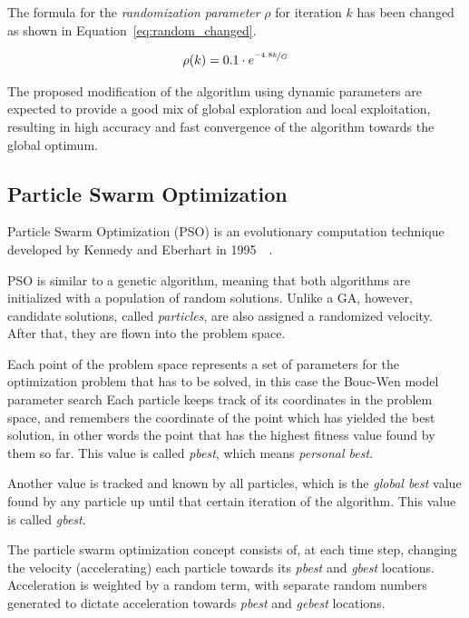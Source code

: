 The formula for the \textit{randomization parameter} $\rho$
for iteration $k$ has been changed as shown in Equation~\ref{eq:random_changed}.

\begin{align}
\label{eq:random_changed}
\rho(k) = 0.1 \cdot e^{\nicefrac{-4.8k}{G}}
\end{align}

The proposed modification of the algorithm using dynamic parameters
are expected to provide a good mix of global exploration and local exploitation,
resulting in high accuracy and fast convergence of the algorithm towards
the global optimum.

\subsection{Particle Swarm Optimization}
\label{sec:5.pso}

Particle Swarm Optimization (PSO) is an evolutionary computation technique
developed by Kennedy and Eberhart in 1995~\cite{kennedy2011particle}~\cite{eberhart1995new}.

PSO is similar to a genetic algorithm, meaning that both algorithms 
are initialized with a population of random solutions. Unlike a GA, however,
candidate solutions, called \textit{particles}, are also assigned a randomized velocity.
After that, they are flown into the problem space.

Each point of the problem space represents a set of parameters for the optimization
problem that has to be solved, in this case the Bouc-Wen model parameter search
Each particle keeps track of its coordinates in the problem space,
and remembers the coordinate of the point which has yielded the best solution,
in other words the point that has the highest fitness value found by them so far.
This value is called \textit{pbest}, which means \textit{personal best}.

Another value is tracked and known by all particles, which is the \textit{global best}
value found by any particle up until that certain iteration of the algorithm.
This value is called \textit{gbest}.

The particle swarm optimization concept consists of, at each time step,
changing the velocity (accelerating) each particle towards its \textit{pbest}
and \textit{gbest} locations. Acceleration is weighted by a random term,
with separate random numbers generated to dictate acceleration towards
\textit{pbest} and \textit{gebest} locations.

